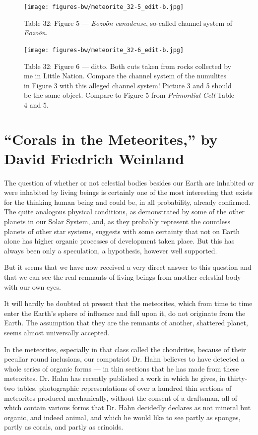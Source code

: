 \documentclass[a4paper, 12pt, oneside]{article}
\begin{document}
\clearpage
\begin{figure}[t]
\texttt{[image: figures-bw/meteorite\_32-5\_edit-b.jpg]}
\caption{Table 32: Figure 5 --- \emph{Eozoön canadense}, so-called channel system of \emph{Eozoön}.}
\centering
\end{figure}
\clearpage
\begin{figure}[t]
\texttt{[image: figures-bw/meteorite\_32-6\_edit-b.jpg]}
\caption{Table 32: Figure 6 --- ditto. Both cuts taken from rocks collected by me in Little Nation. Compare the channel system of the numulites in Figure 3 with this alleged channel system! Picture 3 and 5 should be the same object. Compare to Figure 5 from \emph{Primordial Cell} Table 4 and 5.}
\centering
\end{figure}
\clearpage
\pagestyle{plain}
\section{``Corals in the Meteorites,'' by David Friedrich Weinland}
\paragraph*{}
The question of whether or not celestial bodies besides our Earth are inhabited or were inhabited by living beings is certainly one of the most interesting that exists for the thinking human being and could be, in all probability, already confirmed. The quite analogous physical conditions, as demonstrated by some of the other planets in our Solar System, and, as they probably represent the countless planets of other star systems, suggests with some certainty that not on Earth alone has higher organic processes of development taken place. But this has always been only a speculation, a hypothesis, however well supported.

But it seems that we have now received a very direct answer to this question and that we can see the real remnants of living beings from another celestial body with our own eyes.

It will hardly be doubted at present that the meteorites, which from time to time enter the Earth's sphere of influence and fall upon it, do not originate from the Earth. The assumption that they are the remnants of another, shattered planet, seems almost universally accepted.

In the meteorites, especially in that class called the chondrites, because of their peculiar round inclusions, our compatriot Dr. Hahn believes to have detected a whole series of organic forms --- in thin sections that he has made from these meteorites. Dr. Hahn has recently published a work in which he gives, in thirty-two tables, photographic representations of over a hundred thin sections of meteorites produced mechanically, without the consent of a draftsman, all of which contain various forms that Dr. Hahn decidedly declares as not mineral but organic, and indeed animal, and which he would like to see partly as sponges, partly as corals, and partly as crinoids.
\end{document}
